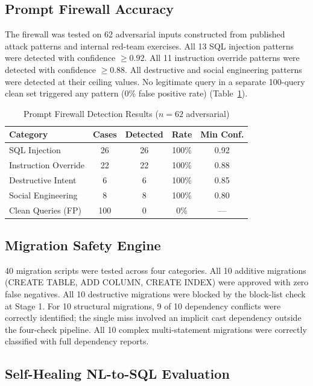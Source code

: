 \documentclass[conference]{IEEEtran}
\begin{document}
\subsection{Prompt Firewall Accuracy}

The firewall was tested on 62 adversarial inputs constructed from
published attack patterns \cite{perez2022ignore,greshake2023indirect} and
internal red-team exercises. All 13 SQL injection patterns were detected
with confidence $\geq 0.92$. All 11 instruction override patterns were
detected with confidence $\geq 0.88$. All destructive and social
engineering patterns were detected at their ceiling values. No legitimate
query in a separate 100-query clean set triggered any pattern
(0\% false positive rate) (Table~\ref{tab:fwresults}).

\begin{table}[htbp]
\caption{Prompt Firewall Detection Results ($n=62$ adversarial)}
\label{tab:fwresults}
\begin{tabular}{lcccc}
\toprule
\textbf{Category} & \textbf{Cases} & \textbf{Detected} & \textbf{Rate} & \textbf{Min Conf.} \\
\midrule
SQL Injection & 26 & 26 & 100\% & 0.92 \\
Instruction Override & 22 & 22 & 100\% & 0.88 \\
Destructive Intent & 6 & 6 & 100\% & 0.85 \\
Social Engineering & 8 & 8 & 100\% & 0.80 \\
Clean Queries (FP) & 100 & 0 & 0\% & --- \\
\bottomrule
\end{tabular}
\end{table}

\subsection{Migration Safety Engine}

40 migration scripts were tested across four categories. All 10 additive
migrations (CREATE TABLE, ADD COLUMN, CREATE INDEX) were approved with
zero false negatives. All 10 destructive migrations were blocked by the
block-list check at Stage 1. For 10 structural migrations, 9 of 10
dependency conflicts were correctly identified; the single miss involved
an implicit cast dependency outside the four-check pipeline. All 10
complex multi-statement migrations were correctly classified with full
dependency reports.

\subsection{Self-Healing NL-to-SQL Evaluation}
\end{document}
